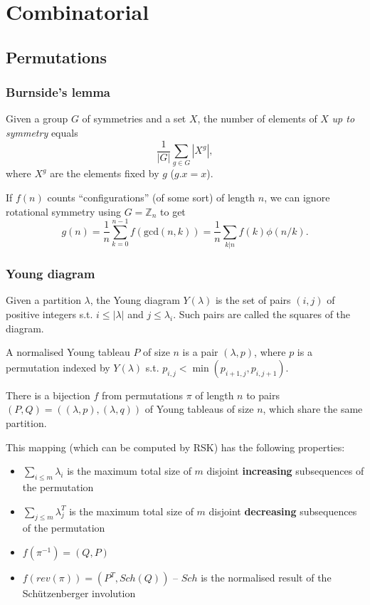 \chapter{Combinatorial}

\section{Permutations}
	\subsection{Burnside's lemma}
		Given a group $G$ of symmetries and a set $X$, the number of elements of $X$ \emph{up to symmetry} equals
		 \[ {\frac {1}{|G|}}\sum _{{g\in G}}|X^{g}|, \]
		 where $X^{g}$ are the elements fixed by $g$ ($g.x = x$).

		 If $f(n)$ counts ``configurations'' (of some sort) of length $n$, we can ignore rotational symmetry using $G = \mathbb Z_n$ to get
		 \[ g(n) = \frac 1 n \sum_{k=0}^{n-1}{f(\text{gcd}(n, k))} = \frac 1 n \sum_{k|n}{f(k)\phi(n/k)}. \]

	\subsection{Young diagram}
		Given a partition $\lambda$, the Young diagram $Y(\lambda)$ is the set of pairs $(i, j)$ of positive integers s.t. $i \leq |\lambda|$ and $j \leq \lambda_i$.
		Such pairs are called the squares of the diagram.
		
		A normalised Young tableau $P$ of size $n$ is a pair $(\lambda, p)$, where $p$ is a permutation indexed by $Y(\lambda)$ s.t. $p_{i, j} < \min(p_{i + 1, j}, p_{i, j + 1})$.

		There is a bijection $f$ from permutations $\pi$ of length $n$ to pairs $(P, Q) = ((\lambda, p), (\lambda, q))$ of Young tableaus of size $n$, which share the same partition.
		
		This mapping (which can be computed by RSK) has the following properties:
		\begin{itemize}
			\item $\sum_{i \leq m} \lambda_i$ is the maximum total size of $m$ disjoint \textbf{increasing} subsequences of the permutation
			\item $\sum_{j \leq m} \lambda_j^T$ is the maximum total size of $m$ disjoint \textbf{decreasing} subsequences of the permutation
			\item $f(\pi^{-1}) = (Q, P)$
			\item $f(rev(\pi)) = (P^T, Sch(Q))$ -- $Sch$ is the normalised result of the Schützenberger involution
		\end{itemize}

